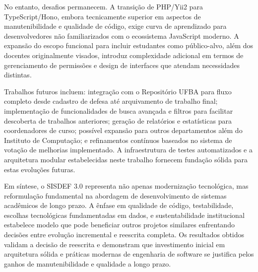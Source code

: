 \documentclass[nonacm, sigconf]{acmart}
\begin{document}
No entanto, desafios permanecem. A transição de PHP/Yii2 para TypeScript/Hono, embora tecnicamente superior em aspectos de manutenibilidade e qualidade de código, exige curva de aprendizado para desenvolvedores não familiarizados com o ecossistema JavaScript moderno. A expansão do escopo funcional para incluir estudantes como público-alvo, além dos docentes originalmente visados, introduz complexidade adicional em termos de gerenciamento de permissões e design de interfaces que atendam necessidades distintas.

Trabalhos futuros incluem: integração com o Repositório UFBA para fluxo completo desde cadastro de defesa até arquivamento de trabalho final; implementação de funcionalidades de busca avançada e filtros para facilitar descoberta de trabalhos anteriores; geração de relatórios e estatísticas para coordenadores de curso; possível expansão para outros departamentos além do Instituto de Computação; e refinamentos contínuos baseados no sistema de votação de melhorias implementado. A infraestrutura de testes automatizados e a arquitetura modular estabelecidas neste trabalho fornecem fundação sólida para estas evoluções futuras.

Em síntese, o SISDEF 3.0 representa não apenas modernização tecnológica, mas reformulação fundamental na abordagem de desenvolvimento de sistemas acadêmicos de longo prazo. A ênfase em qualidade de código, testabilidade, escolhas tecnológicas fundamentadas em dados, e sustentabilidade institucional estabelece modelo que pode beneficiar outros projetos similares enfrentando decisões entre evolução incremental e reescrita completa. Os resultados obtidos validam a decisão de reescrita e demonstram que investimento inicial em arquitetura sólida e práticas modernas de engenharia de software se justifica pelos ganhos de manutenibilidade e qualidade a longo prazo.



\end{document}
